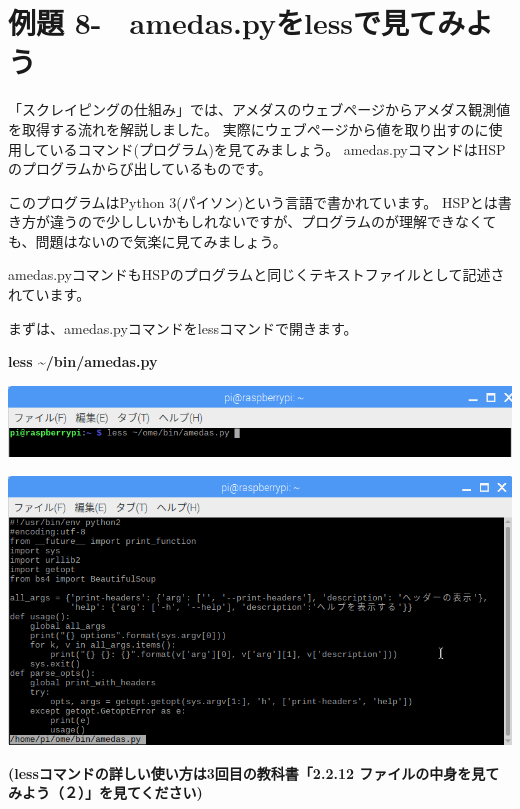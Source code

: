 \documentclass[a4paper,12pt,dvipdfmx]{jarticle}
\newcounter{Exercise}
\renewcommand\theExercise{例題 8-\arabic{Exercise}}
\begin{document}
\bigskip


\bigskip
{}
\clearpage\section{\theExercise　amedas.pyをlessで見てみよう}
「スクレイピングの仕組み」では、アメダスのウェブページからアメダス観測値を取得する流れを解説しました。
実際にウェブページから値を取り出すのに使用しているコマンド(プログラム)を見てみましょう。
amedas.pyコマンドはHSPのプログラムからび出しているものです。

このプログラムはPython
3(パイソン)という言語で書かれています。
HSPとは書き方が違うので少ししいかもしれないですが、プログラムのが理解できなくても、問題はないので気楽に見てみましょう。


\bigskip

amedas.pyコマンドもHSPのプログラムと同じくテキストファイルとして記述されています。

まずは、amedas.pyコマンドをlessコマンドで開きます。


\bigskip

\textbf{less {\textasciitilde}/bin/amedas.py}



\begin{center}
\includegraphics[width=17.006cm]{textbook-img036.png}

\end{center}
\begin{center}
\includegraphics[width=17.006cm]{textbook-img037.png}

\end{center}
{\bfseries
(lessコマンドの詳しい使い方は3回目の教科書「2.2.12
ファイルの中身を見てみよう（２）」を見てください)%
}
\end{document}

